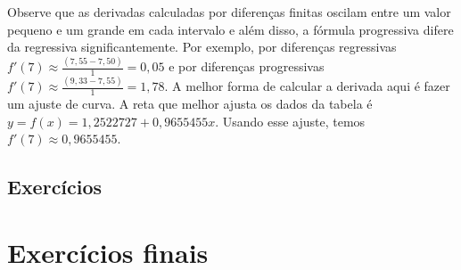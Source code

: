 Observe que as derivadas calculadas por diferenças finitas oscilam entre um valor pequeno e um grande em cada intervalo e além disso, a fórmula progressiva difere da regressiva significantemente. Por exemplo, por diferenças regressivas $f'(7)\approx \frac{(7,55 -  7,50)}{1}=0,05$ e por diferenças progressivas $f'(7)\approx \frac{(9,33 -  7,55)}{1}=1,78$. A melhor forma de calcular a derivada aqui é fazer um ajuste de curva. A reta que melhor ajusta os dados da tabela é $y=f(x)=1,2522727+0,9655455x$. Usando esse ajuste, temos $f'(7)\approx 0,9655455$.

\subsection*{Exercícios}

\emconstrucao


\section{Exercícios finais}

\emconstrucao

% 